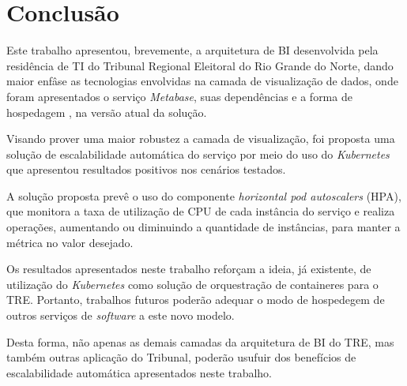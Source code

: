 \section{Conclusão}

Este trabalho apresentou, brevemente, a arquitetura de BI desenvolvida pela residência de TI do Tribunal Regional Eleitoral do Rio Grande do Norte, dando maior enfâse as tecnologias envolvidas na camada de visualização de dados, onde foram apresentados o serviço \textit{Metabase}, suas dependências e a forma de hospedagem , na versão atual da solução.

Visando prover uma maior robustez a camada de visualização, foi proposta uma solução de escalabilidade automática do serviço por meio do uso do \textit{Kubernetes} que apresentou resultados positivos nos cenários testados. 

A solução proposta prevê o uso do componente \textit{horizontal pod autoscalers} (HPA), que monitora a taxa de utilização de CPU de cada instância do serviço e realiza operações, aumentando ou diminuindo a quantidade de instâncias, para manter a métrica no valor desejado.

Os resultados apresentados neste trabalho reforçam a ideia, já existente, de utilização do \textit{Kubernetes} como solução de orquestração de containeres para o TRE. Portanto, trabalhos futuros poderão adequar o modo de hospedegem de outros serviços de \textit{software} a este novo modelo. 

Desta forma, não apenas as demais camadas da arquitetura de BI do TRE, mas também outras aplicação do Tribunal, poderão usufuir dos benefícios de escalabilidade automática apresentados neste trabalho. 